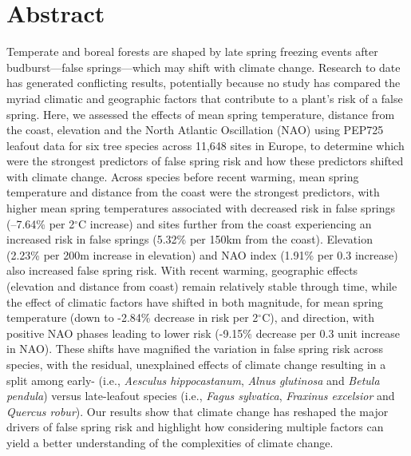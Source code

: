 \documentclass{article}\usepackage[]{graphicx}\usepackage[]{color}
\begin{document}
\section*{Abstract} %
Temperate and boreal forests are shaped by late spring freezing events after budburst---false springs---which may shift with climate change. Research to date has generated conflicting results, potentially because no study has compared the myriad climatic and geographic factors that contribute to a plant's risk of a false spring. Here, we assessed the effects of mean spring temperature, distance from the coast, elevation and the North Atlantic Oscillation (NAO) using PEP725 leafout data for six tree species across 11,648 sites in Europe, to determine which were the strongest predictors of false spring risk and how these predictors shifted with climate change. Across species before recent warming, mean spring temperature and distance from the coast were the strongest predictors, with higher mean spring temperatures associated with decreased risk in false springs (--7.64\% per 2$^{\circ}$C increase) and sites further from the coast experiencing an increased risk in false springs (5.32\% per 150km from the coast). Elevation (2.23\% per 200m increase in elevation) and NAO index (1.91\% per 0.3 increase) also increased false spring risk. With recent warming, geographic effects (elevation and distance from coast) remain relatively stable through time, while the effect of climatic factors have shifted in both magnitude, for mean spring temperature (down to -2.84\% decrease in risk per 2$^{\circ}$C), and direction, with positive NAO phases leading to lower risk (-9.15\% decrease per 0.3 unit increase in NAO). These shifts have magnified the variation in false spring risk across species, with the residual, unexplained effects of climate change resulting in a split among early- (i.e., \textit{Aesculus hippocastanum}, \textit{Alnus glutinosa} and \textit{Betula pendula}) versus late-leafout species (i.e., \textit{Fagus sylvatica}, \textit{Fraxinus excelsior} and \textit{Quercus robur}). Our results show that climate change has reshaped the major drivers of false spring risk and highlight how considering multiple factors can yield a better understanding of the complexities of climate change.
\end{document}
